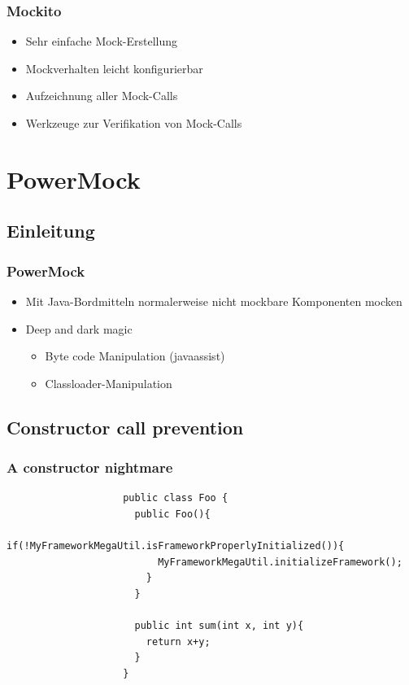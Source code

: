\documentclass{beamer}
\begin{document}
			\begin{frame}
				\frametitle{Mockito}

				\begin{itemize}
					\item{Sehr einfache Mock-Erstellung}
					\item{Mockverhalten leicht konfigurierbar}
					\item{Aufzeichnung aller Mock-Calls}
					\item{Werkzeuge zur Verifikation von Mock-Calls}
				\end{itemize}
			\end{frame}


	
	\section{PowerMock}

		\subsection{Einleitung}

			\begin{frame}
				\frametitle{PowerMock}

				\begin{itemize}
					\item{Mit Java-Bordmitteln normalerweise nicht mockbare Komponenten mocken}
					\item{Deep and dark magic}
						\begin{itemize}
							\item{Byte code Manipulation (javaassist)}
							\item{Classloader-Manipulation}
						\end{itemize}
				\end{itemize}
			\end{frame}

		\subsection{Constructor call prevention}

			\begin{frame}[fragile]
				\frametitle{A constructor nightmare}

				\begin{lstlisting}
					public class Foo {
					  public Foo(){
					    if(!MyFrameworkMegaUtil.isFrameworkProperlyInitialized()){
					      MyFrameworkMegaUtil.initializeFramework();	
					    }
					  }

					  public int sum(int x, int y){
					    return x+y;
					  }
					}
				\end{lstlisting}
			\end{frame}
\end{document}
